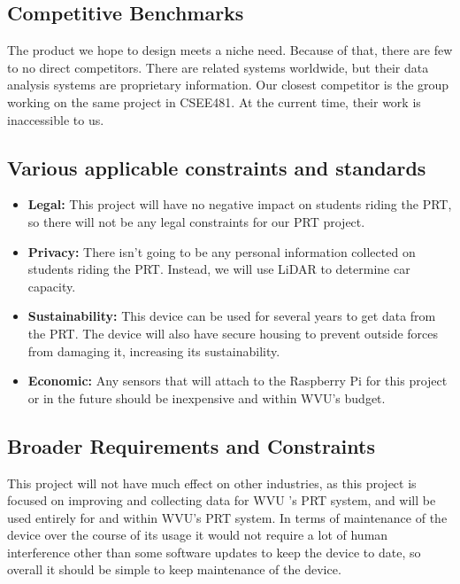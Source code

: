 \subsection{Competitive Benchmarks}
The product we hope to design meets a niche need. Because of that, there are few to no direct competitors. There are related systems worldwide, but their data analysis systems are proprietary information. Our closest competitor is the group working on the same project in CSEE481. At the current time, their work is inaccessible to us.

\subsection{Various applicable constraints and standards}
\begin{itemize}
    \item \textbf{Legal:} This project will have no negative impact on students riding the PRT, so there will not be any legal constraints for our PRT project.
    \item \textbf{Privacy:} There isn't going to be any personal information collected on students riding the PRT. Instead, we will use LiDAR to determine car capacity.
    \item \textbf{Sustainability:} This device can be used for several years to get data from the PRT. The device will also have secure housing to prevent outside forces from damaging it, increasing its sustainability.
    \item \textbf{Economic:} Any sensors that will attach to the Raspberry Pi for this project or in the future should be inexpensive and within WVU’s budget.
\end{itemize}

\subsection{Broader Requirements and Constraints}
This project will not have much effect on other industries, as this project is focused on improving and collecting data for WVU 's PRT system, and will be used entirely for and within WVU’s PRT system. In terms of maintenance of the device over the course of its usage it would not require a lot of human interference other than some software updates to keep the device to date, so overall it should be simple to keep maintenance of the device.
